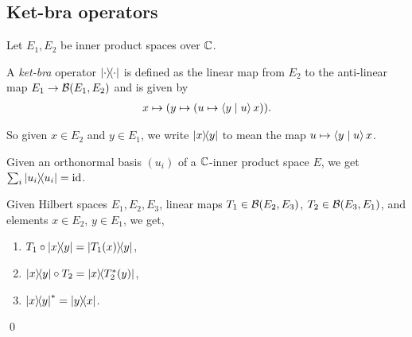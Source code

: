 \subsection{Ket-bra operators}
 Let $E_1,E_2$ be inner product spaces over $\mathbb{C}$.
 \begin{definition}\label{rankOne}\leanok
  A \textit{ket-bra} operator $\left\lvert\cdot\right\rangle\!\!\left\langle\cdot\right\rvert$ is defined as the linear map from $E_2$ to the anti-linear map $E_1\to\mathcal{B}(E_1,E_2)$ and is given by
  \begin{align*}
   x\mapsto(y\mapsto(u\mapsto\left\langle y \mid u\right\rangle x)).
  \end{align*}
 \end{definition} 
 
 So given $x\in{E_2}$ and $y\in{E_1}$, we write $\left\lvert x\right\rangle\!\!\left\langle y\right\rvert$ to mean the map $u\mapsto\left\langle y \mid u\right\rangle x$.

 Given an orthonormal basis $(u_i)$ of a $\mathbb{C}$-inner product space $E$, we get $\sum_i\left\lvert u_i\right\rangle\!\!\left\langle u_i\right\rvert=\operatorname{id}$.
 \begin{lemma}\label{linear_map_comp_rank_one}\leanok\label{rank_one_comp_linear_map}\leanok\label{rank_one.adjoint}\leanok
  Given Hilbert spaces $E_1,E_2,E_3$, linear maps $T_1\in\mathcal{B}(E_2,E_3)$, $T_2\in\mathcal{B}(E_3,E_1)$, and elements $x\in E_2$, $y\in{E_1}$, we get,
  \begin{enumerate}[label=(\roman*)]
   \item $T_1\circ\left\lvert x\right\rangle\!\!\left\langle y\right\rvert=\left\lvert T_1(x)\right\rangle\!\!\left\langle y\right\rvert$,
   \item $\left\lvert x\right\rangle\!\!\left\langle y\right\rvert\circ T_2=\left\lvert x\right\rangle\!\!\left\langle T_2^*(y)\right\rvert$,
   \item $\left\lvert x\right\rangle\!\!\left\langle y\right\rvert^*=\left\lvert y\right\rangle\!\!\left\langle x\right\rvert$.
  \end{enumerate}\qed
 \end{lemma}

